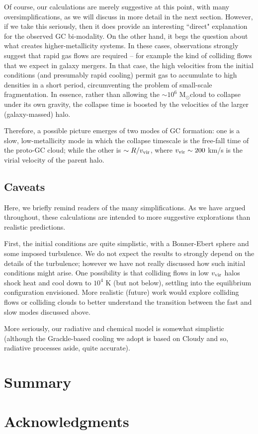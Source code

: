 \documentclass[useAMS,usenatbib]{mn2e}
\newcommand{\msun}{{M$_\odot$}}
\begin{document}
Of course, our calculations are merely suggestive at this point, with many oversimplifications, as we will discuss in more detail in the next section.  However, if we take this seriously, then it does provide an interesting ``direct" explanation for the observed GC bi-modality.  On the other hand, it begs the question about what creates higher-metallicity systems.  In these cases, observations strongly suggest that rapid gas flows are required -- for example the kind of colliding flows that we expect in galaxy mergers.  In that case, the high velocities from the initial conditions (and presumably rapid cooling) permit gas to accumulate to high densities in a short period, circumventing the problem of small-scale fragmentation.  In essence, rather than allowing the $\sim 10^6$ \msun cloud to collapse under its own gravity, the collapse time is boosted by the velocities of the larger (galaxy-massed) halo.  

Therefore, a possible picture emerges of two modes of GC formation: one is a slow, low-metallicity mode in which the collapse timescale is the free-fall time of the proto-GC cloud; while the other is $\sim R/v_{\rm vir}$, where $v_{\rm vir} \sim 200$ km/s is the virial velocity of the parent halo.




\subsection{Caveats}

Here, we briefly remind readers of the many simplifications.  As we have argued throughout, these calculations are intended to more suggestive explorations than realistic predictions.  

First, the initial conditions are quite simplistic, with a Bonner-Ebert sphere and some imposed turbulence.  We do not expect the results to strongly depend on the details of the turbulence; however we have not really discussed how such initial conditions might arise.  One possibility is that colliding flows in low $v_{\rm vir}$ halos shock heat and cool down to $10^4$ K (but not below), settling into the equilibrium configuration envisioned.  More realistic (future) work would explore colliding flows or colliding clouds to better understand the transition between the fast and slow modes discussed above.

More seriously, our radiative and chemical model is somewhat simplistic (although the {\sc Grackle}-based cooling we adopt is based on Cloudy and so, radiative processes aside, quite accurate).

% 
\section{Summary}

% 
\section*{Acknowledgments}

%
\end{document}

